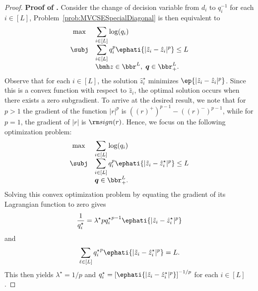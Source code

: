 \documentclass[opre, blindrev]{informs4}
\newcommand{\1}[1]{\mathds{1}{\left(#1\right)}}
\begin{document}
\begin{appendices}
\begin{proof}{\bf Proof of .}
Consider the change of decision variable from $d_i$ to $q_i^{-1}$ for each $i \in [L]$,  Problem~\eqref{prob:MVCSESpecialDiagonal} is then equivalent to 
\[
\begin{array}{cll}
\max & \displaystyle \sum_{i \in [L]}\log(q_i) \\
\subj & \displaystyle\sum_{i \in [L]}q^p_i \ephati{|\tilde z_i - \hat z_i|^p} \leq L \\
& \bmh z \in \bbr^L, \; \bm  q \in \bbr^L_+.  
\end{array} 
\]
Observe that for each $i \in [L]$, the solution $\hat z_i^\star$ minimizes $\ep{|\tilde z_i - \hat z_i|^p}$. Since this is a convex function with respect to $\hat z_i$, the optimal solution occurs when there exists a zero subgradient. To arrive at the desired result, we note that for $p>1$ the gradient of the function $|r|^p$ is $((r)^+)^{p-1}- ((r)^-)^{p-1}$, while for $p=1$, the gradient of $|r|$ is ${\rm sign}(r)$. Hence, we focus on the following optimization problem:
\[
\begin{array}{cll}
\max & \displaystyle \sum_{i \in [L]}\log(q_i) \\
\subj & \displaystyle\sum_{i \in [L]}q^p_i\ephati{|\tilde z_i - \hat z^\star_i|^p} \leq L \\
&\bm  q \in \bbr^L_+.  
\end{array} 
\]
Solving this convex optimization problem by equating the gradient of its Lagrangian function to zero gives 
$$
\frac{1}{q^\star_i} = \lambda^\star p {q^\star_i}^{p-1} \ephati{|\tilde z_i - \hat z^\star_i|^p}
$$
and
$$
\sum_{\ell \in [L]}{q^\star_i}^p\ephati{|\tilde z_i - \hat z^\star_i|^p} = L.
$$
This then yields $\lambda^\star = 1/p$ and ${q^\star_i} = \left[\ephati{|\tilde z_i - \hat z^\star_i|^p}\right]^{-1/p}$ for each $i \in [L]$.
\hfill \Halmos
\end{proof}
\vspace{3mm}


\end{appendices}
\end{document}
